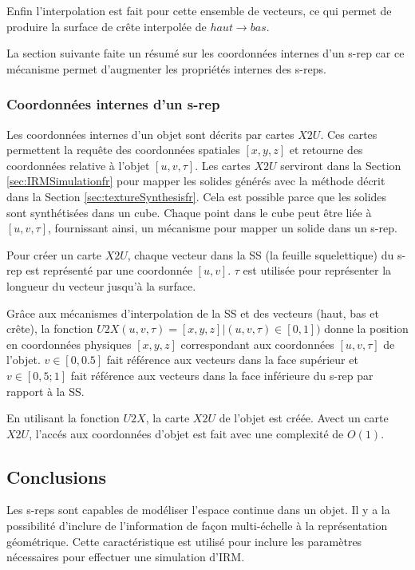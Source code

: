 Enfin l'interpolation est fait pour cette ensemble de vecteurs, 
ce qui permet de produire la surface de crête interpolée de $haut \rightarrow bas$.

La section suivante faite un résumé sur les coordonnées internes d'un s-rep car 
ce mécanisme permet d'augmenter les propriétés internes des s-reps.

\subsubsection{Coordonnées internes d'un s-rep}
\label{sec:internalCoordinatesfr}

Les coordonnées internes d'un objet sont décrits par cartes $X2U$.
Ces cartes permettent la requête des coordonnées spatiales $[x, y, z]$
et retourne des coordonnées relative à l'objet $[u, v, \tau]$.
Les cartes $X2U$ serviront dans la Section \ref{sec:IRMSimulationfr}
pour mapper les solides générés avec la méthode décrit dans la Section \ref{sec:textureSynthesisfr}.
Cela est possible parce que les solides sont synthétisées
dans un cube. Chaque point dans le cube peut être liée à $[u, v, \tau]$, fournissant ainsi,
un mécanisme pour mapper un solide dans un s-rep.

Pour créer un carte $X2U$, 
chaque vecteur dans la SS (la feuille squelettique) du s-rep  est représenté par 
une coordonnée $[u, v]$.
$\tau$ est utilisée pour représenter la longueur du vecteur jusqu'à la surface.

Grâce aux mécanismes d'interpolation de la SS et des vecteurs (haut, bas et crête),
la fonction $U2X(u, v, \tau) = [x, y, z] | (u, v, \tau) \in [0, 1]) $ 
donne la position en coordonnées  physiques $[x, y, z]$ correspondant 
aux coordonnées $[u, v, \tau]$ de l'objet.
$v \in [0, 0.5] $ fait référence aux vecteurs dans la face supérieur
et $v \in [0,5; 1]$ fait référence aux vecteurs dans la face inférieure
du s-rep par rapport à la SS.

En utilisant la fonction $U2X$, la carte $X2U$ 
de l'objet est créée.
Avect un carte $X2U$, l'accés aux coordonnées d'objet est fait avec une complexité 
de $O(1)$.

\subsection{Conclusions}
\label{sec:3dRepConclusionfr}

Les s-reps sont capables de modéliser l'espace continue dans un objet.
Il y a la possibilité d'inclure 
de l'information de façon multi-échelle à la représentation géométrique.
Cette caractéristique est utilisé
pour inclure les paramètres nécessaires pour effectuer une simulation d'IRM.

